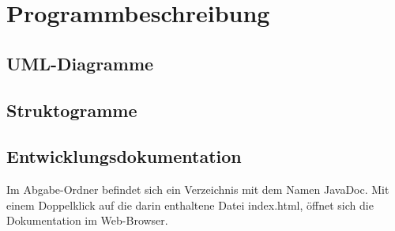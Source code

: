 \chapter{Programmbeschreibung}\label{ch:programmbeschreibung}

\section{UML-Diagramme}\label{sec:uml}


\section{Struktogramme}\label{sec:strukto}


\section{Entwicklungsdokumentation}\label{sec:entwicklerdokumentation}
Im Abgabe-Ordner befindet sich ein Verzeichnis mit dem Namen \glqq JavaDoc\grqq{}.
Mit einem Doppelklick auf die darin enthaltene Datei \glqq index.html\grqq{}, öffnet sich die Dokumentation im Web-Browser.